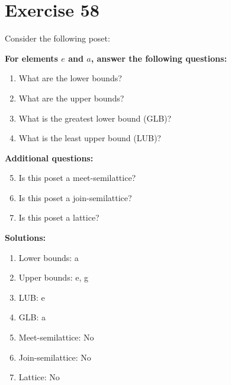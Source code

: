 \documentclass{article}
\begin{document}
\section*{Exercise 58}
Consider the following poset:
\begin{center}
\end{center}

    \textbf{For elements $e$ and $a$, answer the following questions:}
\begin{enumerate}
    \item What are the lower bounds?
    \item What are the upper bounds?
    \item What is the greatest lower bound (GLB)?
    \item What is the least upper bound (LUB)?
\end{enumerate}
    \hspace*{3ex} \textbf{Additional questions:}
\begin{enumerate}
    \setcounter{enumi}{4}
    \item Is this poset a meet-semilattice?
    \item Is this poset a join-semilattice?
    \item Is this poset a lattice?
\end{enumerate}

\textbf{Solutions:}
\begin{enumerate}
    \item Lower bounds: {a}
    \item Upper bounds: {e, g}
    \item LUB: e
    \item GLB: a
    \item Meet-semilattice: No
    \item Join-semilattice: No
    \item Lattice: No
\end{enumerate}
\newpage
\end{document}
